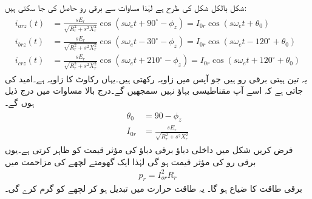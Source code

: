 شکل  بالکل شکل   کی طرح ہے لہٰذا مساوات   سے برقی رو حاصل کی جا سکتی ہیں:
\begin{gather}
\begin{aligned}
i_{arz}(t)&=\frac{s E_r}{\sqrt{R_r^2+s^2 X_r^2}} \cos \left(s \omega_e t +90^{\circ}-\phi_z \right)=I_{0r} \cos (s \omega_e t +\theta_0)\\
i_{brz}(t)&=\frac{s E_r}{\sqrt{R_r^2+s^2 X_r^2}} \cos \left(s \omega_e t -30^{\circ}-\phi_z \right)=I_{0r} \cos (s \omega_e t -120 ^{\circ}+\theta_0)\\
i_{crz}(t)&=\frac{s E_r}{\sqrt{R_r^2+s^2 X_r^2}} \cos \left(s \omega_e t +210^{\circ}-\phi_z \right)=I_{0r} \cos (s \omega_e t+120^{\circ} +\theta_0)
\end{aligned}
\end{gather}
یہ تین ہیتی برقی رو ہیں جو آپس میں   زاویہ رکھتی ہیں۔یہاں  رکاوٹ کا زاویہ ہے۔امید کی جاتی ہے کہ اسے آپ مقناطیسی بہاؤ نہیں سمجھیں گے۔درج بالا مساوات میں درج ذیل ہوں گے۔
\begin{gather}
\begin{aligned}\label{مساوات_امالی_گھومتا_رو}
\theta_0&=90-\phi_z \\
I_{0r}&=\frac{s E_r}{\sqrt{R_r^2+s^2 X_r^2}}
\end{aligned}
\end{gather}
فرض کریں شکل  میں داخلی دباؤ  برقی دباؤ کی مؤثر قیمت کو ظاہر کرتی ہے۔یوں  برقی رو کی مؤثر قیمت ہو گی لہٰذا ایک گھومتے لچھے کی مزاحمت میں 
\begin{align}\label{مساوات_امالی_طاقت_ضیاع_گھمتا_حصہ}
p_r =I_{or}^2 R_r
\end{align}
برقی طاقت کا ضیاع ہو گا۔  یہ طاقت حرارت میں تبدیل ہو کر  لچھے کو گرم کرے گی۔

